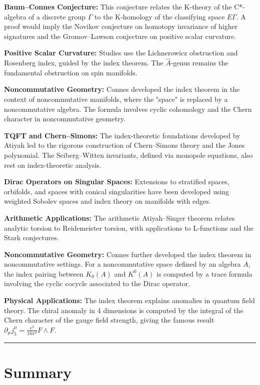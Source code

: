 \textbf{Baum--Connes Conjecture:} This conjecture relates the K-theory of the
C*-algebra of a discrete group $\Gamma$ to the K-homology of the classifying
space $E\Gamma$. A proof would imply the Novikov conjecture on homotopy
invariance of higher signatures and the Gromov--Lawson conjecture on positive
scalar curvature.

\textbf{Positive Scalar Curvature:} Studies use the Lichnerowicz obstruction
and Rosenberg index, guided by the index theorem. The $\widehat{A}$-genus
remains the fundamental obstruction on spin manifolds.

\textbf{Noncommutative Geometry:} Connes developed the index theorem in the
context of noncommutative manifolds, where the "space" is replaced by a
noncommutative algebra. The formula involves cyclic cohomology and the Chern
character in noncommutative geometry.

\textbf{TQFT and Chern--Simons:} The index-theoretic foundations developed by
Atiyah led to the rigorous construction of Chern--Simons theory and the
Jones polynomial. The Seiberg--Witten invariants, defined via monopole equations,
also rest on index-theoretic analysis.

\textbf{Dirac Operators on Singular Spaces:} Extensions to stratified spaces,
orbifolds, and spaces with conical singularities have been developed using
weighted Sobolev spaces and index theory on manifolds with edges.

\textbf{Arithmetic Applications:} The arithmetic Atiyah--Singer theorem relates
analytic torsion to Reidemeister torsion, with applications to L-functions
and the Stark conjectures.

\textbf{Noncommutative Geometry:} Connes further developed the index theorem
in noncommutative settings. For a noncommutative space defined by an algebra
$A$, the index pairing between $K_0(A)$ and $K^0(A)$ is computed by a
trace formula involving the cyclic cocycle associated to the Dirac operator.

\textbf{Physical Applications:} The index theorem explains anomalies in
quantum field theory. The chiral anomaly in 4 dimensions is computed by
the integral of the Chern character of the gauge field strength, giving
the famous result $\partial_\mu j^\mu_5 = \frac{e^2}{16\pi^2} F \wedge F$.

\begin{center}\rule{0.5\linewidth}{0.5pt}\end{center}

\section*{Summary}

